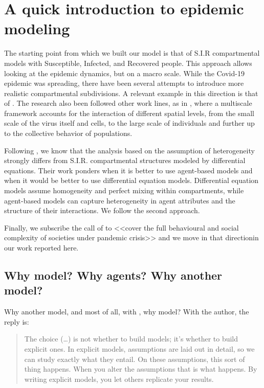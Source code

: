 \documentclass[11pt]{article}
\begin{document}
\section{A quick introduction to epidemic modeling}

The starting point from which we built our model is that of S.I.R compartmental models with Susceptible, Infected, and Recovered people. This approach allows looking at the epidemic dynamics, but on a macro scale. While the Covid-19 epidemic was spreading, there have been several attempts to introduce more realistic compartmental subdivisions. A relevant example in this direction is that of \cite{Scala:2020aa}. The research also been followed other work lines, as in \cite{doi:10.1142/S0218202520500323}, where a multiscale framework accounts for the interaction of different spatial levels, from the small scale of the virus itself and cells, to the large scale of individuals and further up to the collective behavior of populations.

Following \cite{rahmandad2008heterogeneity}, we know that the analysis based on the assumption of  heterogeneity strongly differs from S.I.R. compartmental structures modeled by differential equations. Their work ponders when it is better to use agent-based models and when it would be better to use differential equation models. Differential equation models assume homogeneity and perfect mixing within compartments, while agent-based models can capture heterogeneity in agent attributes and the structure of their interactions. We follow the second approach.

Finally, we subscribe the call of \cite{squazzoni2020} to <<cover the full behavioural and social complexity of societies under pandemic crisis>> and we move in that directionin our work reported here.


\subsection{Why model? Why agents? Why another model? }

Why another model, and most of all, with \cite{epstein2008model}, why model? With the author, the reply is: 
\begin{quote}
The choice (\ldots) is not whether to build models; it's whether to build explicit ones. In explicit models, assumptions are laid out in detail, so we can study exactly what they entail. On these assumptions, this sort of thing happens. When you alter the assumptions that is what happens. By writing explicit models, you let others replicate your results.
\end{quote}
\end{document}
